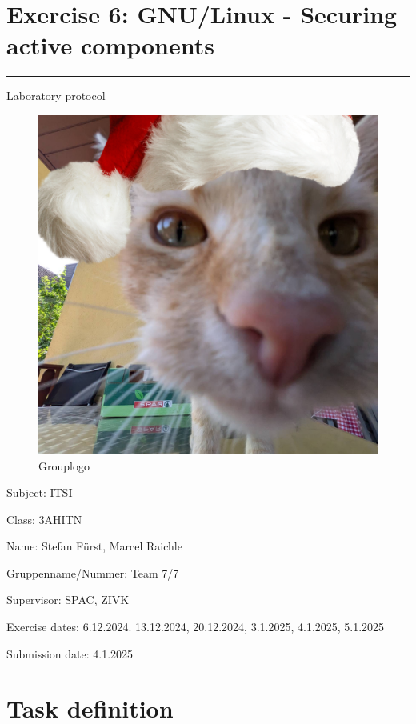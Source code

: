 \documentclass[a4paper]{article}
\begin{document}

\pagestyle{oida}
\section*{Exercise 6: GNU/Linux - Securing active components}
\par\noindent\rule{\textwidth}{0.4pt}

Laboratory protocol
\begin{figure}[h]
	\includegraphics[scale=0.28]{images/mika.png}
	\centering
	\caption{Grouplogo}
\end{figure}

\vspace*{\fill}
Subject:	ITSI

Class:	3AHITN

Name:	Stefan Fürst, Marcel Raichle

Gruppenname/Nummer: Team 7/7

Supervisor: 	SPAC, ZIVK

Exercise dates:	6.12.2024. 13.12.2024, 20.12.2024, 3.1.2025, 4.1.2025, 5.1.2025

Submission date: 4.1.2025


\newpage
\tableofcontents

\newpage

\section{Task definition}
\end{document}
